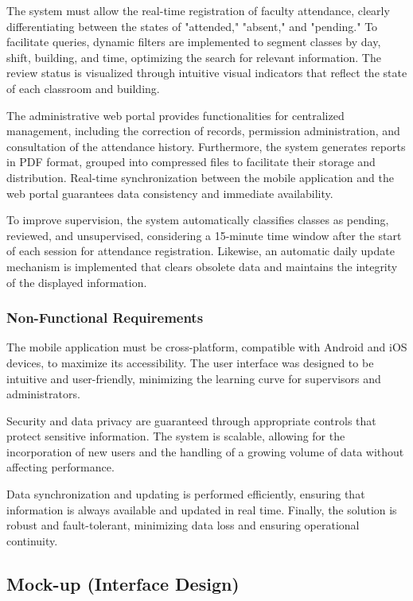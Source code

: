 \documentclass[journal=information,article,submit,pdftex,oneauthor]{Definitions/mdpi}
\begin{document}
	The system must allow the real-time registration of faculty attendance, clearly differentiating between the states of "attended," "absent," and "pending." To facilitate queries, dynamic filters are implemented to segment classes by day, shift, building, and time, optimizing the search for relevant information. The review status is visualized through intuitive visual indicators that reflect the state of each classroom and building.
	
	The administrative web portal provides functionalities for centralized management, including the correction of records, permission administration, and consultation of the attendance history. Furthermore, the system generates reports in PDF format, grouped into compressed files to facilitate their storage and distribution. Real-time synchronization between the mobile application and the web portal guarantees data consistency and immediate availability.
	
	To improve supervision, the system automatically classifies classes as pending, reviewed, and unsupervised, considering a 15-minute time window after the start of each session for attendance registration. Likewise, an automatic daily update mechanism is implemented that clears obsolete data and maintains the integrity of the displayed information.
	
	\subsubsection{Non-Functional Requirements}
	
	The mobile application must be cross-platform, compatible with Android and iOS devices, to maximize its accessibility. The user interface was designed to be intuitive and user-friendly, minimizing the learning curve for supervisors and administrators.
	
	Security and data privacy are guaranteed through appropriate controls that protect sensitive information. The system is scalable, allowing for the incorporation of new users and the handling of a growing volume of data without affecting performance.
	
	Data synchronization and updating is performed efficiently, ensuring that information is always available and updated in real time. Finally, the solution is robust and fault-tolerant, minimizing data loss and ensuring operational continuity.
	
	\subsection{Mock-up (Interface Design)}
	
\end{document}
